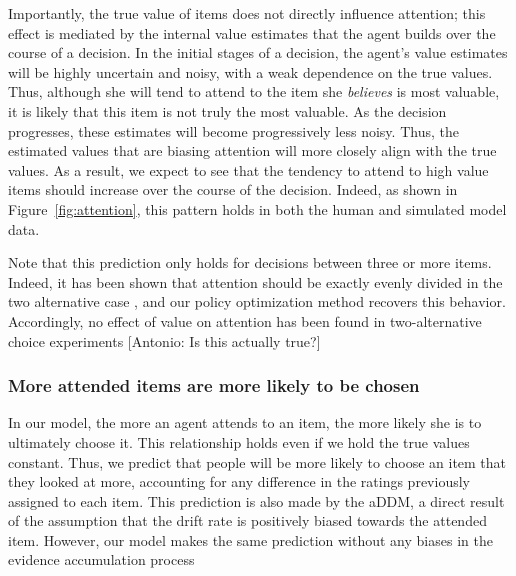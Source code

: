 \documentclass[12pt,a4paperpaper,]{article}
\begin{document}
Importantly, the true value of items does not directly influence attention; this effect is mediated by the internal value estimates that the agent builds over the course of a decision. In the initial stages of a decision, the agent's value estimates will be highly uncertain and noisy, with a weak dependence on the true values. Thus, although she will tend to attend to the item she \emph{believes} is most valuable, it is likely that this item is not truly the most valuable. As the decision progresses, these estimates will become progressively less noisy. Thus, the estimated values that are biasing attention will more closely align with the true values. As a result, we expect to see that the tendency to attend to high value items should increase over the course of the decision. Indeed, as shown in Figure~\ref{fig:attention}, this pattern holds in both the human and simulated model data.

Note that this prediction only holds for decisions between three or more items. Indeed, it has been shown that attention should be exactly evenly divided in the two alternative case \citep{Fudenberg2018}, and our policy optimization method recovers this behavior. Accordingly, no effect of value on attention has been found in two-alternative choice experiments [Antonio: Is this actually true?]

\subsubsection{More attended items are more likely to be chosen}





In our model, the more an agent attends to an item, the more likely she is to ultimately choose it. This relationship holds even if we hold the true values constant. Thus, we predict that people will be more likely to choose an item that they looked at more, accounting for any difference in the ratings previously assigned to each item. This prediction is also made by the aDDM, a direct result of the assumption that the drift rate is positively biased towards the attended item. However, our model makes the same prediction without any biases in the evidence accumulation process
\end{document}
